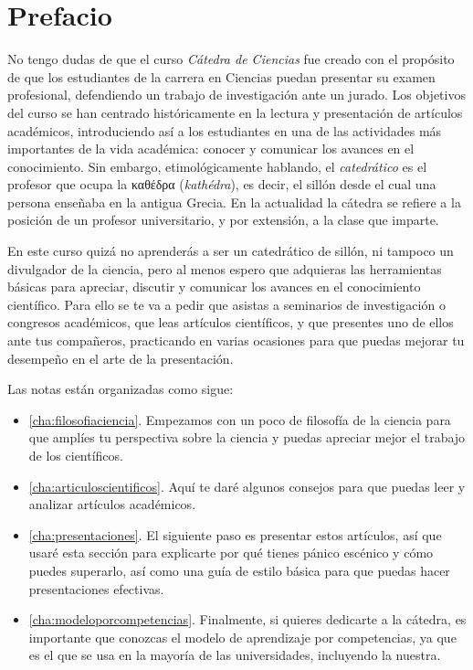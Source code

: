 \chapter{Prefacio}
\label{cha:prefacio}

No tengo dudas de que el curso \emph{Cátedra de Ciencias} fue creado con el
propósito de que los estudiantes de la carrera en Ciencias puedan presentar su
examen profesional, defendiendo un trabajo de investigación ante un jurado.
Los objetivos del curso se han centrado históricamente en la lectura y
presentación de artículos académicos, introduciendo así a los estudiantes en
una de las actividades más importantes de la vida académica: conocer y
comunicar los avances en el conocimiento.
Sin embargo, etimológicamente hablando, el \emph{catedrático} es el profesor
que ocupa la καθέδρα (\emph{kathédra}), es decir, el sillón desde el cual una
persona enseñaba en la antigua Grecia.
En la actualidad la cátedra se refiere a la posición de un profesor
universitario, y por extensión, a la clase que imparte.

En este curso quizá no aprenderás a ser un catedrático de sillón, ni tampoco un
divulgador de la ciencia, pero al menos espero que adquieras las herramientas
básicas para apreciar, discutir y comunicar los avances en el conocimiento
científico.
Para ello se te va a pedir que asistas a seminarios de investigación o
congresos académicos, que leas artículos científicos, y que presentes uno de
ellos ante tus compañeros, practicando en varias ocasiones para que puedas
mejorar tu desempeño en el arte de la presentación.

Las notas están organizadas como sigue:

\begin{itemize}
    \item \autoref{cha:filosofiaciencia}. Empezamos con un poco de filosofía de
          la ciencia para que amplíes tu perspectiva sobre la ciencia y puedas
          apreciar mejor el trabajo de los científicos.
    \item \autoref{cha:articuloscientificos}. Aquí te daré algunos consejos
          para que puedas leer y analizar artículos académicos.
    \item \autoref{cha:presentaciones}. El siguiente paso es presentar estos
          artículos, así que usaré esta sección para explicarte por qué tienes
          pánico escénico y cómo puedes superarlo, así como una guía de estilo
          básica para que puedas hacer presentaciones efectivas.
    \item \autoref{cha:modeloporcompetencias}. Finalmente, si quieres
          dedicarte a la cátedra, es importante que conozcas el modelo de
          aprendizaje por competencias, ya que es el que se usa en la mayoría
          de las universidades, incluyendo la nuestra.
\end{itemize}
